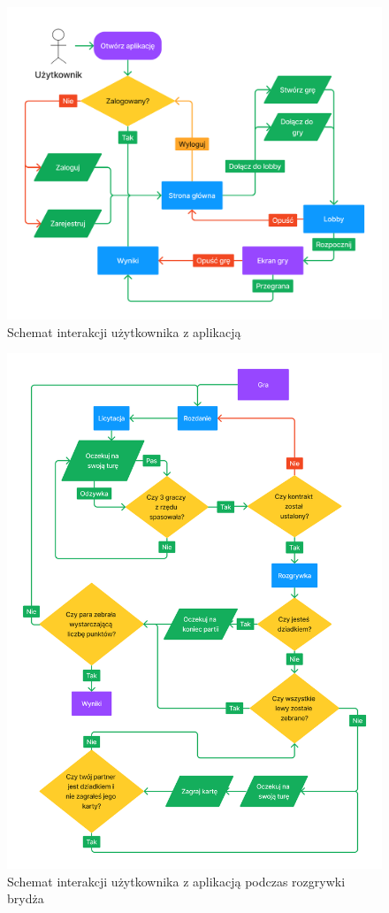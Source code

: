 \begin{figure}[h]
  \centering
  \includegraphics[width=\textwidth]{img/flow-aplikacji/user_flow.png}
  \caption{Schemat interakcji użytkownika z aplikacją}
  \label{fig:figma_userflow}
\end{figure}

\begin{figure}[h]
  \centering
  \includegraphics[width=\textwidth]{img/flow-aplikacji/game_flow.png}
  \caption{Schemat interakcji użytkownika z aplikacją podczas rozgrywki brydża}
\end{figure}

